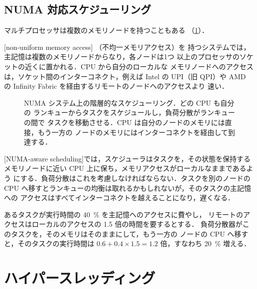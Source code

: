 \documentclass[../main.tex]{subfiles}
\begin{document}
\subsection{NUMA 対応スケジューリング}

マルチプロセッサは複数のメモリノードを持つこともある
（\cref{fig:l07-numa}）．

\begin{definition}[NUMA]
  [non-uniform memory access]%
  （不均一メモリアクセス）を
  持つシステムでは，主記憶は複数のメモリノードからなり，各ノードは1つ
  以上のプロセッサのソケットの近くに置かれる．CPU から自分のローカルな
  メモリノードへのアクセスは，ソケット間のインターコネクト，例えば Intel
  の UPI（旧 QPI）や AMD の Infinity Fabric を経由するリモートのノードへのアクセスより
  速い．
\end{definition}

\begin{figure}[htbp]
  \centering
  
  \caption{NUMA システム上の階層的なスケジューリング．どの CPU も自分の
    ランキューからタスクをスケジュールし，負荷分散がランキューの間で
    タスクを移動させる．CPU は自分のノードのメモリには直接，もう一方の
    ノードのメモリにはインターコネクトを経由して到達する．}
  \label{fig:l07-numa}
\end{figure}

%
[NUMA-aware scheduling]では，スケジューラはタスクを，その状態を保持する
メモリノードに近い CPU 上に保ち，メモリアクセスがローカルなままであるよう
にする．負荷分散はこれを考慮しなければならない．タスクを別のノードの CPU
へ移すとランキューの均衡は取れるかもしれないが，そのタスクの主記憶への
アクセスはすべてインターコネクトを越えることになり，遅くなる．

\begin{example}
  あるタスクが実行時間の \SI{40}{\percent} を主記憶へのアクセスに費やし，
  リモートのアクセスはローカルのアクセスの 1.5 倍の時間を要するとする．
  負荷分散器がこのタスクを，そのメモリはそのままにして，もう一方の
  ノードの CPU へ移すと，そのタスクの実行時間は
  $0.6 + 0.4 \times 1.5 = 1.2$ 倍，すなわち \SI{20}{\percent} 増える．
\end{example}

\section{ハイパースレッディング}
\label{sec:l07-smt}
\end{document}

